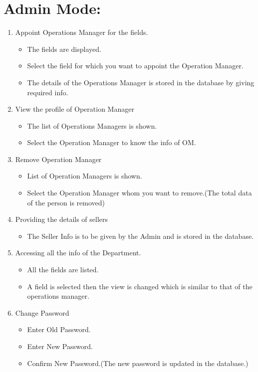 \documentclass[12pt,a4paper]{article}
\begin{document}
    \section{Admin Mode:}
    \begin{enumerate}
    \item Appoint Operations Manager for the fields.
    \begin{itemize}
    \item The fields are displayed.
    \item Select the field for which you want to appoint the Operation Manager.
    \item The details of the Operations Manager is stored in the database by giving required info.
    \end{itemize}
    
    \item View the profile of Operation Manager
    \begin{itemize}
    \item The list of Operations Managers is shown.
    \item Select the Operation Manager to know the info of OM.
    \end{itemize}
    
    \item Remove Operation Manager
    \begin{itemize}
    \item List of Operation Managers is shown.
    \item Select the Operation Manager whom you want to remove.(The total data of the person is removed)
    \end{itemize}
    
    \item Providing the details of sellers
    \begin{itemize}
    \item The Seller Info is to be given by the Admin and is stored in the database.
    \end{itemize}
        
    \item Accessing all the info of the Department.
    \begin{itemize}
    \item All the fields are listed.
    \item A field is selected then the view is changed which is similar to that of the operations manager.
    \end{itemize}
    
    \item Change Password
    \begin{itemize}
    \item Enter Old Password.
    \item Enter New Password.
    \item Confirm New Password.(The new password is updated in the database.)
    \end{itemize}
    \end{enumerate}
    
\end{document}
